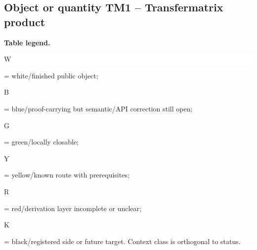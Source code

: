 \subsection*{Object or quantity TM1 -- Transfermatrix product}
\hypertarget{objproof:TM1}{}
\par\smallskip\noindent\begin{minipage}{0.99\linewidth}\footnotesize\raggedright\textbf{Table legend.} \colorbox{white}{\strut W} = white/finished public object; \colorbox{cyan!20}{\strut B} = blue/proof-carrying but semantic/API correction still open; \colorbox{green!18}{\strut G} = green/locally closable; \colorbox{yellow!25}{\strut Y} = yellow/known route with prerequisites; \colorbox{red!20}{\strut R} = red/derivation layer incomplete or unclear; \colorbox{black!18}{\strut K} = black/registered side or future target. Context class is orthogonal to status.\end{minipage}\par\vspace{0.25em}
